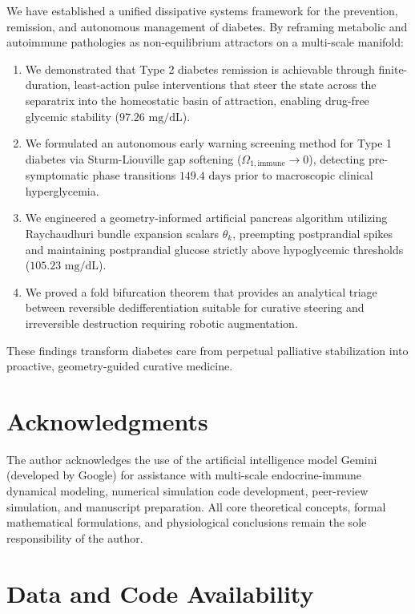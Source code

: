 \documentclass[11pt,a4paper]{article}
\begin{document}
We have established a unified dissipative systems framework for the prevention, remission, and autonomous management of diabetes. By reframing metabolic and autoimmune pathologies as non-equilibrium attractors on a multi-scale manifold:
\begin{enumerate}
    \item We demonstrated that Type 2 diabetes remission is achievable through finite-duration, least-action pulse interventions that steer the state across the separatrix into the homeostatic basin of attraction, enabling drug-free glycemic stability ($97.26\text{ mg/dL}$).
    \item We formulated an autonomous early warning screening method for Type 1 diabetes via Sturm-Liouville gap softening ($\Omega_{1,\mathrm{immune}} \to 0$), detecting pre-symptomatic phase transitions $149.4\text{ days}$ prior to macroscopic clinical hyperglycemia.
    \item We engineered a geometry-informed artificial pancreas algorithm utilizing Raychaudhuri bundle expansion scalars $\theta_k$, preempting postprandial spikes and maintaining postprandial glucose strictly above hypoglycemic thresholds ($105.23\text{ mg/dL}$).
    \item We proved a fold bifurcation theorem that provides an analytical triage between reversible dedifferentiation suitable for curative steering and irreversible destruction requiring robotic augmentation.
\end{enumerate}

These findings transform diabetes care from perpetual palliative stabilization into proactive, geometry-guided curative medicine.

\section*{Acknowledgments}
The author acknowledges the use of the artificial intelligence model Gemini (developed by Google) for assistance with multi-scale endocrine-immune dynamical modeling, numerical simulation code development, peer-review simulation, and manuscript preparation. All core theoretical concepts, formal mathematical formulations, and physiological conclusions remain the sole responsibility of the author.

\section*{Data and Code Availability}
\end{document}
